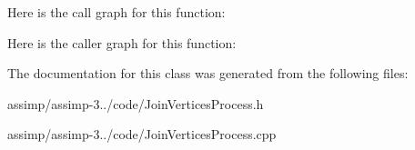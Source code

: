 Here is the call graph for this function\+:




Here is the caller graph for this function\+:




The documentation for this class was generated from the following files\+:\begin{DoxyCompactItemize}
\item 
assimp/assimp-\/3../code/Join\+Vertices\+Process.\+h\item 
assimp/assimp-\/3../code/Join\+Vertices\+Process.\+cpp\end{DoxyCompactItemize}
